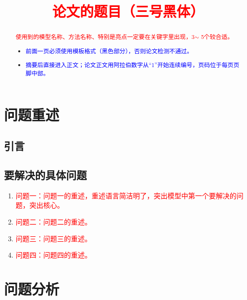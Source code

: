 \documentclass[a4paper]{nmmcm}
\title{\textcolor{red}{论文的题目（三号黑体）}}
\date{}
\begin{document}
\begin{abstract}


\begin{keywords}
{\song\xiaosihao
\textcolor{red}{使用到的模型名称、方法名称、特别是亮点一定要在关键字里出现，3$\sim$ 5个较合适。}}
\end{keywords}

\begin{itemize}
  \item \textcolor{blue}{前面一页必须使用模板格式（黑色部分），否则论文检测不通过。}
  \item \textcolor{blue}{ 摘要后直接进入正文；论文正文用阿拉伯数字从“1”开始连续编号，页码位于每页页脚中部。}
\end{itemize}

\end{abstract}
\maketitle 

\newpage
\setcounter{page}{1}
\pagestyle{fancy}

\section{问题重述}
\subsection{引言}


\subsection{要解决的具体问题}
\begin{enumerate}
  \item \textcolor{red}{问题一：问题一的重述，重述语言简洁明了，突出模型中第一个要解决的问题，突出核心。}
  \item \textcolor{red}{问题二：问题二的重述。}
  \item \textcolor{red}{问题三：问题三的重述。}
  \item \textcolor{red}{问题四：问题四的重述。}
\end{enumerate}







\section{问题分析}
\end{document}
